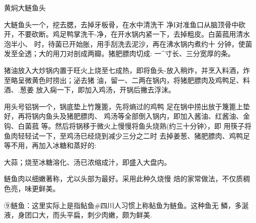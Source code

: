 \begin{recipe}{黄焖大鲢鱼头}

\ingredients









\cooking

\step 	大鲢鱼头一个，挖去腮，去掉牙板骨，在水中清洗干 净I对准鱼口从脑顶骨中砍开，不要砍断。鸡足鸭掌洗干-净，在开水锅内紧一下，去掉粗皮。白菌菰用清水泡半小、 时，待菌已开始胀，用手刮洗去泥沙，再在沸水锅内煮约十 分钟，使菌发至全透；大的用刀对剖成两瓣。猪肥膘肉切成: 一^寸长、三分宽厚的条。

\step 	猪油放入大炒锅内置于旺火上烧至七成热，即将鱼头-放入稍炸，并烹入料酒，炸至略呈微黄色时捞出；泌去猪 油，留一、二两在锅内，将猪肥膘肉及鸡鸭足、料酒、.葱姜 放入痫一下，即加入鸡汤，开锅后撇去浮沫。

\step 	用头号铝锅一个，锅底垫上竹篾篦，先将熵过的鸡鸭 足在锅中捞出放于篾篦上垫好，再将锅内鱼头及猪肥膘肉、 鸡汤等全部倒入锅内，即加入酱油、红酱油、金钩、白菌菰 等。然后将锅移于微火上慢慢将鱼头烧熟(约三十分钟〉，即 用筷子将鱼肉轻轻试一下，至鸡汤已经烧到减少三分之二时 去掉姜葱、猪肥膘肉、鸡鸭足等不用，再加入冰糖和蒸好的:

大蒜；烧至冰糖溶化、汤已浓缩成汁，即盛入大盘内。

\notes

鲢鱼肉以细嫩著称，尤以头部为最好。采用此种久烧慢 焙的家常做法，不仅质稠色亮，味更鲜美。

⑨鲢鱼：这里实际上是指鲇鱼#四川人习惯上称鲇鱼为鲢鱼。这种鱼无 鱗，多涎液，身团口大，而头平扁，刺少肉嫩，颇为鲜美.

\end{recipe}

